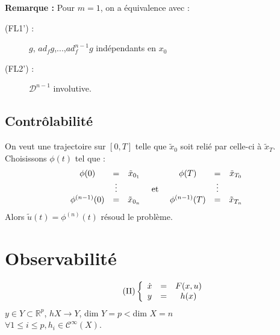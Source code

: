 \textbf{Remarque :} Pour $m=1$, on a équivalence avec :
\begin{description}
	\item[(FL1') :] $g$, $ad_fg$,...,$ad_f^{n-1}g$ indépendants en $x_0$
	\item[(FL2') :] $\mathcal{D}^{n-1}$ involutive.
\end{description}


\subsection{Contrôlabilité}
On veut une trajectoire sur $[0,T]$ telle que $\tilde{x}_0$ soit relié par celle-ci à $\tilde{x}_T$.\\
Choisissons $\phi(t)$ tel que : \[\begin{array}{c c c c c c c}
\phi(0)&=&\tilde{x}_{0_1} & & \phi(T)&=&\tilde{x}_{T_0}\\
   &\vdots& &\text{ et }&  &\vdots&\\
\phi^{(n-1)}(0)&=&\tilde{x}_{0_n} & & \phi^{(n-1)}(T)&=&\tilde{x}_{T_n}
\end{array}\]
Alors $\tilde{u}(t)=\phi^{(n)}(t)$ résoud le problème.

\section{Observabilité}
\begin{equation}\label{probComp} \tag{$\Pi$}
\left\{ \begin{array}{c c c}
	\dot{x}&=&F(x,u)\\
	y&=&h(x)
\end{array} \right.\end{equation}
$y\in Y\subset\mathbb{R}^p$, $hX\to Y$, dim $Y=p<$dim $X=n$\\
$\forall 1\leq i\leq p, h_i\in \mathcal{C}^{\infty}(X)$.

